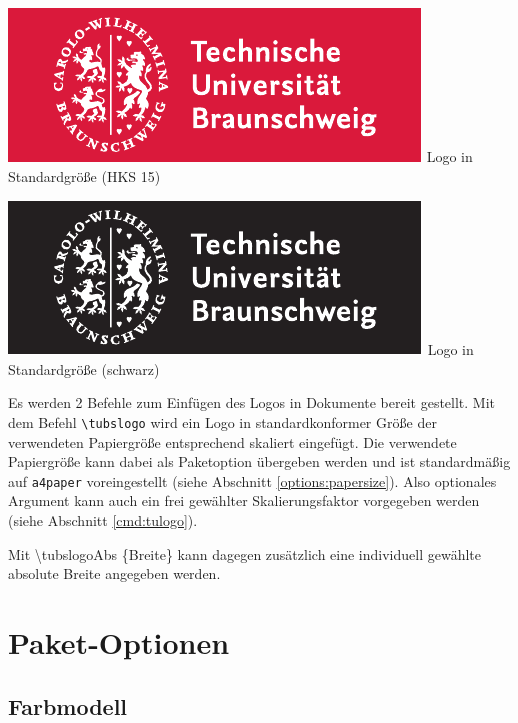 \documentclass{scrartcl}
\begin{document}
\begin{minipage}{0.5\textwidth}
  \centering
  \includegraphics[width=\tulogoBaseWidth]{TUBraunschweig_SC}
  {\sffamily Logo in Standardgröße (HKS 15)}
\end{minipage}
\begin{minipage}{0.5\textwidth}
  \centering
  \includegraphics[width=\tulogoBaseWidth]{TUBraunschweig_B}
  {\sffamily Logo in Standardgröße (schwarz)}
\end{minipage}

Es werden 2 Befehle zum Einfügen des Logos in Dokumente bereit gestellt.
Mit dem Befehl {\color{tuRed}\lstinline{\tubslogo}} wird ein Logo in
standardkonformer Größe der verwendeten Papiergröße entsprechend skaliert
eingefügt. Die verwendete Papiergröße kann dabei als Paketoption übergeben
werden und ist standardmäßig auf \lstinline{a4paper} voreingestellt
(siehe Abschnitt \ref{options:papersize}).
Also optionales Argument kann auch ein frei gewählter Skalierungsfaktor
vorgegeben werden (siehe Abschnitt \ref{cmd:tulogo}).

Mit {\color{tuRed}\ttfamily \textbackslash tubslogoAbs%
    \{\textcolor{tuGreenDark}{Breite}\}}
kann dagegen zusätzlich eine individuell gewählte absolute Breite
angegeben werden.


\section{Paket-Optionen}

\subsection{Farbmodell}\label{options:color}
\end{document}
